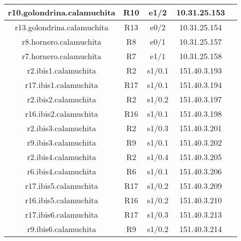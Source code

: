 \begin{tabular}{|c|c|c|c|c|}
	\hline
	r10.golondrina.calamuchita & R10 & e1/2 & 10.31.25.153 \\
	\hline
	r13.golondrina.calamuchita & R13 & e0/2 & 10.31.25.154 \\
	\hline

	\hline
	r8.hornero.calamuchita & R8 & e0/1 & 10.31.25.157 \\
	\hline
	r7.hornero.calamuchita & R7 & e1/1 & 10.31.25.158 \\
	\hline

	\hline
	r2.ibis1.calamuchita & R2 & s1/0.1 & 151.40.3.193 \\
	\hline
	r17.ibis1.calamuchita & R17 & s1/0.1 & 151.40.3.194 \\
	\hline

	\hline
	r2.ibis2.calamuchita & R2 & s1/0.2 & 151.40.3.197 \\
	\hline
	r16.ibis2.calamuchita & R16 & s1/0.1 & 151.40.3.198 \\
	\hline

	\hline
	r2.ibis3.calamuchita & R2 & s1/0.3 & 151.40.3.201 \\
	\hline
	r9.ibis3.calamuchita & R9 & s1/0.1 & 151.40.3.202 \\
	\hline

	\hline
	r2.ibis4.calamuchita & R2 & s1/0.4 & 151.40.3.205 \\
	\hline
	r6.ibis4.calamuchita & R6 & s1/0.1 & 151.40.3.206 \\
	\hline

	\hline
	r17.ibis5.calamuchita & R17 & s1/0.2 & 151.40.3.209 \\
	\hline
	r16.ibis5.calamuchita & R16 & s1/0.2 & 151.40.3.210 \\
	\hline

	\hline
	r17.ibis6.calamuchita & R17 & s1/0.3 & 151.40.3.213 \\
	\hline
	r9.ibis6.calamuchita & R9 & s1/0.2 & 151.40.3.214 \\
	\hline

\end{tabular}
\newpage
